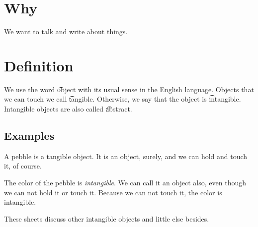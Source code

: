 
\section*{Why}

We want to talk and write about things.

\section*{Definition}

We use the word \t{object} with its usual sense in the English language.
Objects that we can touch we call \t{tangible}.
Otherwise, we say that the object is \t{intangible}.
Intangible objects are also called \t{abstract}.

\subsection*{Examples}

A pebble is a tangible object.
It is an object, surely, and we can hold and touch it, of course.

The color of the pebble is \textit{intangible}.
We can call it an object also, even though we can not hold it or touch it.
Because we can not touch it, the color is intangible.

These sheets discuss other intangible objects and little else besides.

\blankpage
